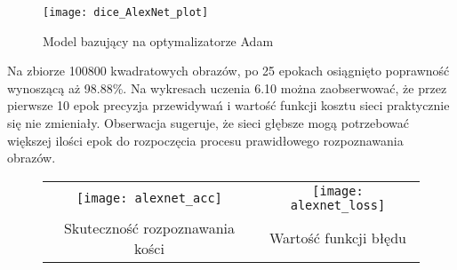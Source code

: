 \begin{figure}[h!]
\centering
\texttt{[image: dice\_AlexNet\_plot]}
\caption{Model bazujący na optymalizatorze Adam}
\label{fig:alexnet}
\end{figure}
Na zbiorze 100800 kwadratowych obrazów, po 25 epokach osiągnięto poprawność wynoszącą aż 98.88\%.
Na wykresach uczenia 6.10 można zaobserwować, że przez pierwsze 10 epok precyzja przewidywań
i wartość funkcji kosztu sieci praktycznie się nie zmieniały. Obserwacja sugeruje, że sieci
głębsze mogą potrzebować większej ilości epok do rozpoczęcia procesu prawidłowego rozpoznawania obrazów.\\
\begin{figure}[h!]
\begin{center}
\begin{tabular}{cc}
\texttt{[image: alexnet\_acc]} &
\texttt{[image: alexnet\_loss]} \\
 Skuteczność rozpoznawania kości & Wartość funkcji błędu\\
\end{tabular}
\label{fig:alexnet_plot}
\end{center}
\end{figure}

